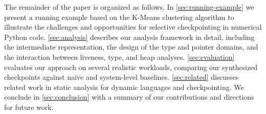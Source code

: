 The remainder of the paper is organized as follows. In \autoref{sec:running-example} we present a running example based on the K-Means clustering algorithm to illustrate the challenges and opportunities for selective checkpointing in numerical Python code. \autoref{sec:analysis} describes our analysis framework in detail, including the intermediate representation, the design of the type and pointer domains, and the interaction between liveness, type, and heap analyses. \autoref{sec:evaluation} evaluates our approach on several realistic workloads, comparing our synthesized checkpoints against naive and system-level baselines. \autoref{sec:related} discusses related work in static analysis for dynamic languages and checkpointing. We conclude in \autoref{sec:conclusion} with a summary of our contributions and directions for future work.

